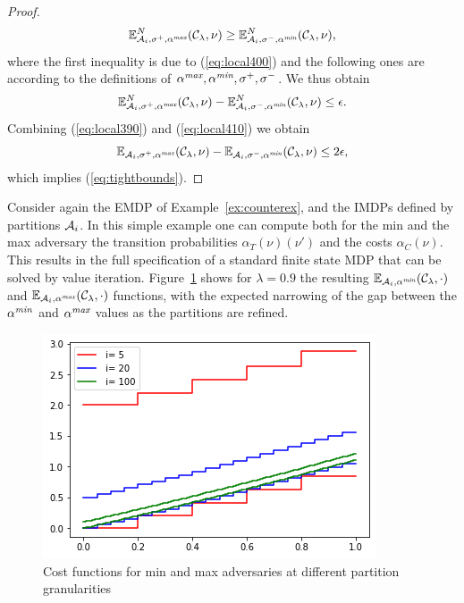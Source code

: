 \documentclass{llncs}
\begin{document}
\begin{proof}
\begin{multline}
\mathbb{E}^N_{\mathcal{A}_i,\sigma^+,\alpha^{\emph{max}}}(\mathcal{C}_{\lambda},\nu)\geq
\mathbb{E}^N_{\mathcal{A}_i,\sigma^-,\alpha^{\emph{min}}}(\mathcal{C}_{\lambda},\nu),
\end{multline}
where the first inequality is due to (\ref{eq:local400}) and the following ones are according
to the definitions of $\alpha^{\emph{max}},\alpha^{\emph{min}},\sigma^+,\sigma^-$. We thus obtain
\begin{equation}
\label{eq:local410}
\mathbb{E}^N_{\mathcal{A}_i,\sigma^+,\alpha^{\emph{max}}}(\mathcal{C}_{\lambda},\nu)-
\mathbb{E}^N_{\mathcal{A}_i,\sigma^-,\alpha^{\emph{min}}}(\mathcal{C}_{\lambda},\nu)\leq \epsilon.
\end{equation}
Combining (\ref{eq:local390}) and (\ref{eq:local410}) we obtain
\begin{equation}
\mathbb{E}_{\mathcal{A}_i,\sigma^+,\alpha^{\emph{max}}}(\mathcal{C}_{\lambda},\nu)-
\mathbb{E}_{\mathcal{A}_i,\sigma^-,\alpha^{\emph{min}}}(\mathcal{C}_{\lambda},\nu)\leq 2\epsilon,
\end{equation}
which implies (\ref{eq:tightbounds}).
\end{proof}

\begin{example}
\label{ex:valit}
Consider again the EMDP of Example~\ref{ex:counterex}, and the IMDPs defined by partitions $\mathcal{A}_i$.
In this simple example one can compute both for the min and the max adversary the transition probabilities
$\alpha_T(\nu)(\nu')$ and the costs $\alpha_C(\nu)$.
This results in the full specification of a standard finite state MDP that can be solved
by value iteration. Figure~\ref{fig:1dcosts} shows for $\lambda=0.9$ the resulting
$\mathbb{E}_{\mathcal{A}_i,\alpha^{\emph{min}}}(\mathcal{C}_{\lambda},\cdot)$ and $\mathbb{E}_{\mathcal{A}_i,\alpha^{\emph{max}}}(\mathcal{C}_{\lambda},\cdot)$
functions, with the expected narrowing of the gap between the $\alpha^{\emph{min}}$ and $\alpha^{\emph{max}}$ values as
the partitions are refined.
\end{example}

\begin{figure}[t]
\centering
\includegraphics[scale=0.5]{./Figures/valit.png}
\caption{Cost functions for min and max adversaries at different partition granularities\label{fig:1dcosts}}
\end{figure}
\end{document}
